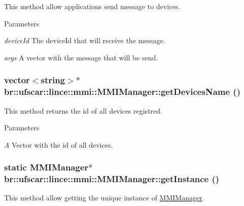 This method allow applications send message to devices. 


\begin{DoxyParams}{Parameters}
\item[{\em deviceId}]The deviceId that will receive the message. \item[{\em args}]A vector with the message that will be send. \end{DoxyParams}
\hypertarget{classbr_1_1ufscar_1_1lince_1_1mmi_1_1MMIManager_a10ea6c549e2381748e8f6dbab2181942}{
\subsubsection[{getDevicesName}]{\setlength{\rightskip}{0pt plus 5cm}vector$<$string$>$$\ast$ br::ufscar::lince::mmi::MMIManager::getDevicesName ()}}
\label{classbr_1_1ufscar_1_1lince_1_1mmi_1_1MMIManager_a10ea6c549e2381748e8f6dbab2181942}


This method returns the id of all devices registred. 


\begin{DoxyParams}{Parameters}
\item[{\em A}]Vector with the id of all devices. \end{DoxyParams}
\hypertarget{classbr_1_1ufscar_1_1lince_1_1mmi_1_1MMIManager_ab14c6d4285139f01cc5d67a5e650b9c4}{
\subsubsection[{getInstance}]{\setlength{\rightskip}{0pt plus 5cm}static {\bf MMIManager}$\ast$ br::ufscar::lince::mmi::MMIManager::getInstance ()}}
\label{classbr_1_1ufscar_1_1lince_1_1mmi_1_1MMIManager_ab14c6d4285139f01cc5d67a5e650b9c4}


This method allow getting the unique instance of \hyperlink{classbr_1_1ufscar_1_1lince_1_1mmi_1_1MMIManager}{MMIManager}. 


